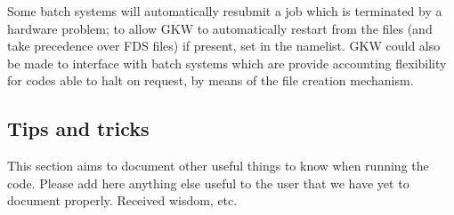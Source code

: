 Some batch systems will automatically resubmit a job which is terminated by a hardware problem; 
to allow GKW to automatically restart from the  files (and take precedence over FDS files) if present, 
set  in the  namelist.   GKW could also be made to interface with batch 
systems which are provide accounting flexibility for codes able to halt on request,
by means of the  file creation mechanism.  

\pagebreak

\subsection{Tips and tricks}


This section aims to document other useful things to know when running the
code. Please add here anything else useful to the user that we have yet to
document properly. Received wisdom, etc.

